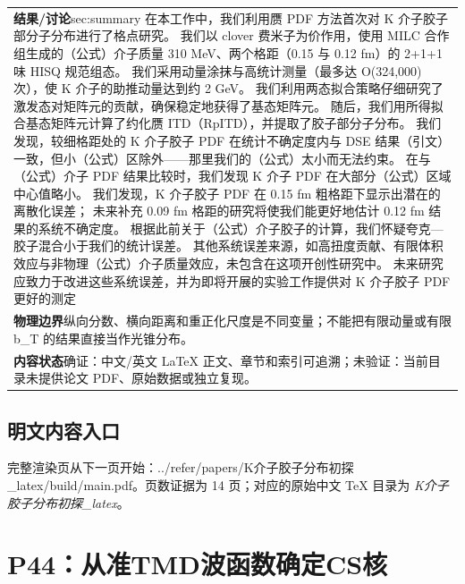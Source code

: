 \documentclass[UTF8,11pt,oneside]{ctexbook}
\begin{document}
\begin{table}[htbp]
\begin{tabular}{@{}p{}@{}}
    \textbf{结果/讨论}\quad sec:summary 在本工作中，我们利用赝 PDF 方法首次对 K 介子胶子部分子分布进行了格点研究。 我们以 clover 费米子为价作用，使用 MILC 合作组生成的（公式）介子质量 310 MeV、两个格距（0.15 与 0.12 fm）的 2+1+1 味 HISQ 规范组态。 我们采用动量涂抹与高统计测量（最多达 O(324,000) 次），使 K 介子的助推动量达到约 2 GeV。 我们利用两态拟合策略仔细研究了激发态对矩阵元的贡献，确保稳定地获得了基态矩阵元。 随后，我们用所得拟合基态矩阵元计算了约化赝 ITD（RpITD），并提取了胶子部分子分布。 我们发现，较细格距处的 K 介子胶子 PDF 在统计不确定度内与 DSE 结果（引文）一致，但小（公式）区除外——那里我们的（公式）太小而无法约束。 在与（公式）介子 PDF 结果比较时，我们发现 K 介子 PDF 在大部分（公式）区域中心值略小。 我们发现，K 介子胶子 PDF 在 0.15 fm 粗格距下显示出潜在的离散化误差； 未来补充 0.09 fm 格距的研究将使我们能更好地估计 0.12 fm 结果的系统不确定度。 根据此前关于（公式）介子胶子的计算，我们怀疑夸克—胶子混合小于我们的统计误差。 其他系统误差来源，如高扭度贡献、有限体积效应与非物理（公式）介子质量效应，未包含在这项开创性研究中。 未来研究应致力于改进这些系统误差，并为即将开展的实验工作提供对 K 介子胶子 PDF 更好的测定 \\
    \textbf{物理边界}\quad 纵向分数、横向距离和重正化尺度是不同变量；不能把有限动量或有限 b\_T 的结果直接当作光锥分布。 \\
    \textbf{内容状态}\quad 确证：中文/英文 LaTeX 正文、章节和索引可追溯；未验证：当前目录未提供论文 PDF、原始数据或独立复现。 \\
    \bottomrule
  \end{tabular}
\end{table}
\section*{明文内容入口}
\noindent 完整渲染页从下一页开始：../\allowbreak{}refer/\allowbreak{}papers/\allowbreak{}K介子胶子分布初探\_\allowbreak{}latex/\allowbreak{}build/\allowbreak{}main.pdf。页数证据为 14 页；对应的原始中文 TeX 目录为 \emph{K介子胶子分布初探\_latex}。
\clearpage

\clearpage

\chapter{P44：从准TMD波函数确定CS核}
\end{document}
